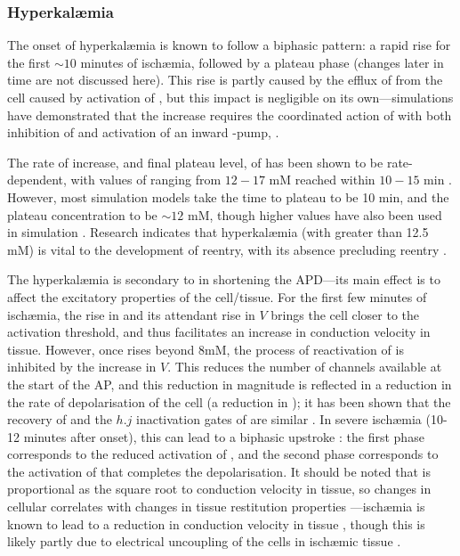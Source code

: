 \documentclass[../thesis-main.tex]{subfiles}
\begin{document}
 \subsubsection{Hyperkal\ae{}mia}
 \label{subsubsec:hyperkalaemia}
 The onset of hyperkal\ae{}mia is known to follow a biphasic pattern: a rapid rise for the first $\sim10$ minutes of isch\ae{}mia, followed by a plateau phase (changes later in time are not discussed here). This rise is partly caused by the efflux of \K{} from the cell caused by activation of \ikatp{}, but this impact is negligible on its own---simulations have demonstrated that the increase requires the coordinated action of \ikatp{} with both inhibition of \inak{} and activation of an inward \na{}-pump, \inas{} \citep{Rodriguez2002}.
 
 The rate of increase, and final plateau level, of \ko{} has been shown to be rate-dependent, with values of \ko{} ranging from $12-17$ mM reached within $10-15$ min \citep{Rodriguez2002, Coetzee1987}. However, most simulation models take the time to plateau to be 10 min, and the plateau concentration to be $\sim12$ mM, though higher values have also been used in simulation \citep{Ferrero2003a, Trenor2007}. Research indicates that hyperkal\ae{}mia (with \ko{} greater than 12.5 mM) is vital to the development of reentry, with its absence precluding reentry \citep{Ferrero2003}.
 
 The hyperkal\ae{}mia is secondary to \ikatp{} in shortening the APD---its main effect is to affect the excitatory properties of the cell/tissue. For the first few minutes of isch\ae{}mia, the rise in \ko{} and its attendant rise in $V$ brings the cell closer to the activation threshold, and thus facilitates an increase in conduction velocity in tissue. However, once \ko{} rises beyond 8mM, the process of reactivation of \ina{} is inhibited by the increase in $V$. This reduces the number of \ina{} channels available at the start of the AP, and this reduction in \ina{} magnitude is reflected in a reduction in the rate of depolarisation of the cell (a reduction in \dvdt{}); it has been shown that the recovery of \dvdt{} and the $h.j$ inactivation gates of \ina{} are similar \citep{Shaw1997}. In severe isch\ae{}mia (10-12 minutes after onset), this can lead to a biphasic upstroke \citep{Barrett1997}: the first phase corresponds to the reduced activation of \ina{}, and the second phase corresponds to the activation of \ica{} that completes the depolarisation. It should be noted that \dvdt{} is proportional as the square root to conduction velocity in tissue, so changes in cellular \dvdt{} correlates with changes in tissue restitution properties \citep{Kleber2004, Walton1983, Tasaki1957}---isch\ae{}mia is known to lead to a reduction in conduction velocity in tissue \citep{Caldwell2007}, though this is likely partly due to electrical uncoupling of the cells in isch\ae{}mic tissue \citep{Kleber1987}.
 
\end{document}
